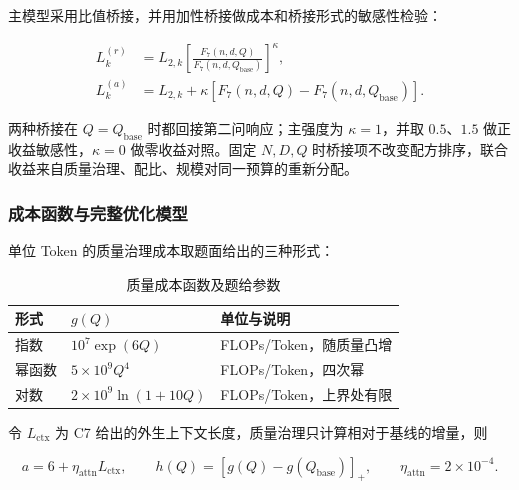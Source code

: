 主模型采用比值桥接，并用加性桥接做成本和桥接形式的敏感性检验：

\begin{equation}\label{eq:q3_6}
    \begin{aligned}
        L_k^{(r)} & =L_{2,k}\left[\frac{F_7(n,d,Q)}{F_7(n,d,Q_{\mathrm{base}})}\right]^{\kappa}, \\
        L_k^{(a)} & =L_{2,k}+\kappa\left[F_7(n,d,Q)-F_7(n,d,Q_{\mathrm{base}})\right].
    \end{aligned}
\end{equation}

两种桥接在 $Q=Q_{\mathrm{base}}$ 时都回接第二问响应；主强度为 $\kappa=1$，并取 $0.5$、$1.5$ 做正收益敏感性，$\kappa=0$ 做零收益对照。固定 $N,D,Q$ 时桥接项不改变配方排序，联合收益来自质量治理、配比、规模对同一预算的重新分配。

\subsubsection{成本函数与完整优化模型}

单位 Token 的质量治理成本取题面给出的三种形式：

\begin{table}[htbp]\centering\setlength{\tabcolsep}{3pt}\renewcommand{\arraystretch}{1.12}
    \caption{质量成本函数及题给参数}\label{tab:q3_3}
    \begin{tabularx}{\textwidth}{>{\raggedright\arraybackslash}p{2.578448cm}>{\raggedright\arraybackslash}p{6.941975cm}>{\raggedright\arraybackslash}X}\toprule
        形式  & $g(Q)$                  & 单位与说明             \\
        \midrule
        指数  & $10^7\exp(6Q)$          & FLOPs/Token，随质量凸增 \\
        幂函数 & $5\times10^9Q^4$        & FLOPs/Token，四次幂   \\
        对数  & $2\times10^9\ln(1+10Q)$ & FLOPs/Token，上界处有限 \\
        \bottomrule\end{tabularx}
\end{table}

令 $L_{\mathrm{ctx}}$ 为 C7 给出的外生上下文长度，质量治理只计算相对于基线的增量，则

\begin{equation}\label{eq:q3_7}
    a=6+\eta_{\mathrm{attn}}L_{\mathrm{ctx}},\qquad
    h(Q)=[g(Q)-g(Q_{\mathrm{base}})]_+,\qquad
    \eta_{\mathrm{attn}}=2\times10^{-4}.
\end{equation}

